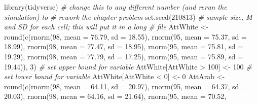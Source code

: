 \documentclass[
  11pt,
]{book}
\newenvironment{Shaded}{\begin{snugshade}}{\end{snugshade}}
\newcommand{\AttributeTok}[1]{\textcolor[rgb]{0.77,0.63,0.00}{#1}}
\newcommand{\CommentTok}[1]{\textcolor[rgb]{0.56,0.35,0.01}{\textit{#1}}}
\newcommand{\DecValTok}[1]{\textcolor[rgb]{0.00,0.00,0.81}{#1}}
\newcommand{\FloatTok}[1]{\textcolor[rgb]{0.00,0.00,0.81}{#1}}
\newcommand{\FunctionTok}[1]{\textcolor[rgb]{0.00,0.00,0.00}{#1}}
\newcommand{\NormalTok}[1]{#1}
\newcommand{\OtherTok}[1]{\textcolor[rgb]{0.56,0.35,0.01}{#1}}
\newcommand{\SpecialCharTok}[1]{\textcolor[rgb]{0.00,0.00,0.00}{#1}}
\begin{document}
\begin{Shaded}
\begin{Highlighting}[]
\FunctionTok{library}\NormalTok{(tidyverse)}
\CommentTok{\# change this to any different number (and rerun the simulation) to}
\CommentTok{\# rework the chapter problem}
\FunctionTok{set.seed}\NormalTok{(}\DecValTok{210813}\NormalTok{)}
\CommentTok{\# sample size, M and SD for each cell; this will put it in a long}
\CommentTok{\# file}
\NormalTok{AttWhite }\OtherTok{\textless{}{-}} \FunctionTok{round}\NormalTok{(}\FunctionTok{c}\NormalTok{(}\FunctionTok{rnorm}\NormalTok{(}\DecValTok{98}\NormalTok{, }\AttributeTok{mean =} \FloatTok{76.79}\NormalTok{, }\AttributeTok{sd =} \FloatTok{18.55}\NormalTok{), }\FunctionTok{rnorm}\NormalTok{(}\DecValTok{95}\NormalTok{, }\AttributeTok{mean =} \FloatTok{75.37}\NormalTok{,}
    \AttributeTok{sd =} \FloatTok{18.99}\NormalTok{), }\FunctionTok{rnorm}\NormalTok{(}\DecValTok{98}\NormalTok{, }\AttributeTok{mean =} \FloatTok{77.47}\NormalTok{, }\AttributeTok{sd =} \FloatTok{18.95}\NormalTok{), }\FunctionTok{rnorm}\NormalTok{(}\DecValTok{95}\NormalTok{, }\AttributeTok{mean =} \FloatTok{75.81}\NormalTok{,}
    \AttributeTok{sd =} \FloatTok{19.29}\NormalTok{), }\FunctionTok{rnorm}\NormalTok{(}\DecValTok{98}\NormalTok{, }\AttributeTok{mean =} \FloatTok{77.79}\NormalTok{, }\AttributeTok{sd =} \FloatTok{17.25}\NormalTok{), }\FunctionTok{rnorm}\NormalTok{(}\DecValTok{95}\NormalTok{, }\AttributeTok{mean =} \FloatTok{75.89}\NormalTok{,}
    \AttributeTok{sd =} \FloatTok{19.44}\NormalTok{)), }\DecValTok{3}\NormalTok{)}
\CommentTok{\# set upper bound for variable}
\NormalTok{AttWhite[AttWhite }\SpecialCharTok{\textgreater{}} \DecValTok{100}\NormalTok{] }\OtherTok{\textless{}{-}} \DecValTok{100}
\CommentTok{\# set lower bound for variable}
\NormalTok{AttWhite[AttWhite }\SpecialCharTok{\textless{}} \DecValTok{0}\NormalTok{] }\OtherTok{\textless{}{-}} \DecValTok{0}
\NormalTok{AttArab }\OtherTok{\textless{}{-}} \FunctionTok{round}\NormalTok{(}\FunctionTok{c}\NormalTok{(}\FunctionTok{rnorm}\NormalTok{(}\DecValTok{98}\NormalTok{, }\AttributeTok{mean =} \FloatTok{64.11}\NormalTok{, }\AttributeTok{sd =} \FloatTok{20.97}\NormalTok{), }\FunctionTok{rnorm}\NormalTok{(}\DecValTok{95}\NormalTok{, }\AttributeTok{mean =} \FloatTok{64.37}\NormalTok{,}
    \AttributeTok{sd =} \FloatTok{20.03}\NormalTok{), }\FunctionTok{rnorm}\NormalTok{(}\DecValTok{98}\NormalTok{, }\AttributeTok{mean =} \FloatTok{64.16}\NormalTok{, }\AttributeTok{sd =} \FloatTok{21.64}\NormalTok{), }\FunctionTok{rnorm}\NormalTok{(}\DecValTok{95}\NormalTok{, }\AttributeTok{mean =} \FloatTok{70.52}\NormalTok{,}

\end{Highlighting}
\end{Shaded}
\end{document}
